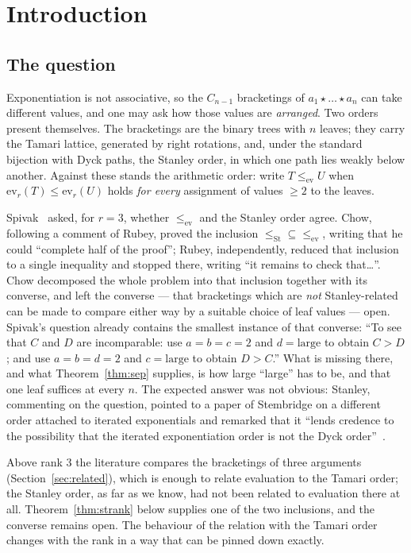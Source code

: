 \documentclass[11pt,a4paper]{article}
\theoremstyle{plain}
\theoremstyle{definition}
\newcommand{\ev}{\mathrm{ev}}
\newcommand{\St}{\mathrm{St}}
\begin{document}
\section{Introduction}\label{sec:intro}

\subsection{The question}

Exponentiation is not associative, so the $C_{n-1}$ bracketings of $a_1\star\dots\star
a_n$ can take different values, and one may ask how those values are \emph{arranged}.
Two orders present themselves. The bracketings are the binary trees with $n$ leaves;
they carry the Tamari lattice, generated by right rotations, and, under the standard
bijection with Dyck paths, the Stanley order, in which one path lies weakly below
another. Against these stands the arithmetic order: write $T\le_{\ev}U$ when
$\ev_r(T)\le\ev_r(U)$ holds \emph{for every} assignment of values $\ge2$ to the leaves.

Spivak~\cite{MO} asked, for $r=3$, whether $\le_{\ev}$ and the Stanley order agree.
Chow, following a comment of Rubey, proved the inclusion $\le_{\St}\subseteq\le_{\ev}$,
writing that he could ``complete half of the proof''; Rubey, independently, reduced that
inclusion to a single inequality and stopped there, writing ``it remains to check
that\ldots''. Chow decomposed the
whole problem into that inclusion together with its converse, and left the converse ---
that bracketings which are \emph{not} Stanley-related can be made to compare either way
by a suitable choice of leaf values --- open. Spivak's question already contains the
smallest instance of that converse: ``To see that $C$ and $D$ are incomparable: use
$a=b=c=2$ and $d=\text{large}$ to obtain $C>D$; and use $a=b=d=2$ and
$c=\text{large}$ to obtain $D>C$.'' What is missing there, and what Theorem~\ref{thm:sep} supplies, is how large
``large'' has to be, and that one leaf suffices at every $n$. The expected answer was not obvious: Stanley,
commenting on the question, pointed to a paper of Stembridge on a different order
attached to iterated exponentials and remarked that it ``lends credence to the
possibility that the iterated exponentiation order is not the Dyck order''~\cite{MO}.

Above rank $3$ the literature compares the bracketings of three arguments
(Section~\ref{sec:related}), which is enough to relate evaluation to the Tamari order;
the Stanley order, as far as we know, had not been related to evaluation there at all.
Theorem~\ref{thm:strank} below supplies one of the two inclusions, and the converse
remains open. The
behaviour of the relation with the Tamari order changes with the rank in a way that can
be pinned down exactly.
\end{document}
